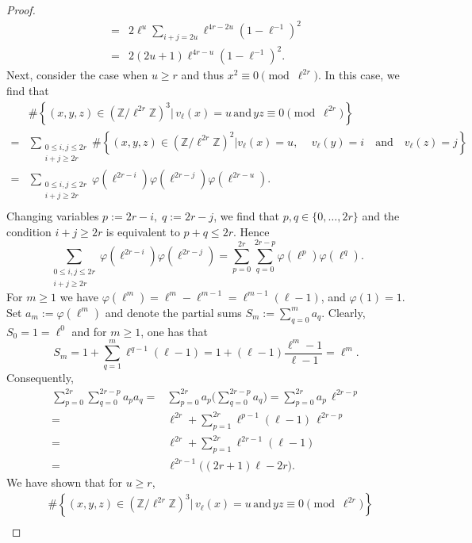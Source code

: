 \documentclass[10pt,a4paper]{amsart}
\newcommand{\Z}{\mathbb{Z}}
\begin{document}
\begin{proof}
\begin{equation}
\begin{split}
=& 2\ell^u\sum_{i+j=2u} \ell^{4r-2u}\left(1-\ell^{-1}\right)^2\\
=& 2(2u+1) \ell^{4r-u}\left(1-\ell^{-1}\right)^2.
\end{split}\end{equation}
Next, consider the case when $u\geq r$ and thus $x^2\equiv 0\pmod{\ell^{2r}}$. In this case, we find that 
\[\begin{split}&\#\left\{(x,y,z)\in(\Z/\ell^{2r}\Z)^3|\, v_\ell(x)=u\,\text{and}\, yz\equiv 0\pmod{\ell^{2r}}\right\}\\
=&\sum_{\substack{0\leq i,j\leq 2r\\
i+j\geq 2r}} \#\left\{(x,y,z)\in(\Z/\ell^{2r}\Z)^2|v_\ell(x)=u,\quad \, v_\ell(y)=i\quad\text{and}\quad v_\ell(z)=j\right\}\\
=& \sum_{\substack{0\leq i,j\leq 2r\\
i+j\geq 2r}}\varphi(\ell^{2r-i})\varphi(\ell^{2r-j})\varphi(\ell^{2r-u}).\\
\end{split}\]
\noindent Changing variables \(p:=2r-i,\; q:=2r-j\), we find that \(p,q\in\{0,\dots,2r\}\) and the condition \(i+j\ge2r\) is equivalent to \(p+q\le2r\). Hence
\[
\sum_{\substack{0\le i,j\le 2r\\ i+j\ge 2r}}
\varphi(\ell^{2r-i})\varphi(\ell^{2r-j})
=
\sum_{p=0}^{2r}\sum_{q=0}^{2r-p}\varphi(\ell^{p})\varphi(\ell^{q}).
\]
\noindent For \(m\ge1\) we have \(\varphi(\ell^{m})=\ell^{m}-\ell^{m-1}=\ell^{m-1}(\ell-1)\), and \(\varphi(1)=1\). Set
\(
a_m:=\varphi(\ell^m)
\)
and denote the partial sums \(S_m:=\sum_{q=0}^{m}a_q\). Clearly, $S_0=1=\ell^0$ and for $m\geq 1$, one has that
\[
S_m=1+\sum_{q=1}^m \ell^{q-1}(\ell-1)=1+(\ell-1)\frac{\ell^{m}-1}{\ell-1}=\ell^{m}.
\]
Consequently,
\[
\begin{split} \sum_{p=0}^{2r}\sum_{q=0}^{2r-p}a_p a_q
=&\sum_{p=0}^{2r} a_p\Big(\sum_{q=0}^{2r-p}a_q\Big)
=\sum_{p=0}^{2r} a_p\,\ell^{2r-p}\\
=&\ell^{2r} + \sum_{p=1}^{2r} \ell^{p-1}(\ell-1)\,\ell^{2r-p}\\
= & \ell^{2r} + \sum_{p=1}^{2r} \ell^{2r-1}(\ell-1)\\
=&\ell^{2r-1}\big((2r+1)\ell - 2r\big).
\end{split}
\]
We have shown that for $u\geq r$,
\begin{equation}\label{u>=r eqn}\begin{split}
&\#\left\{(x,y,z)\in(\Z/\ell^{2r}\Z)^3|\, v_\ell(x)
=u\,\text{and}\, yz\equiv 0\pmod{\ell^{2r}}\right\}\\

\end{split}
\end{equation}
\end{proof}
\end{document}
